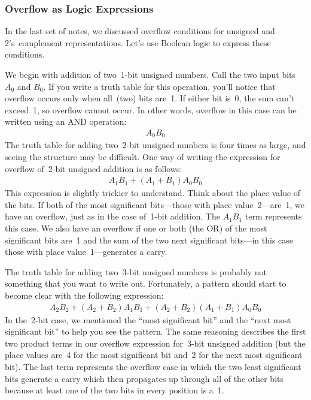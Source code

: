 \vfill

\subsubsection{Overflow as Logic Expressions}

In the last set of notes, we discussed overflow conditions for unsigned
and 2's~complement representations.  Let's use Boolean logic to express
these conditions.  

We begin with addition of two~\mbox{1-bit} unsigned numbers.  
Call the two input bits~$A_0$ and $B_0$.  If you write a truth table for
this operation, you'll notice that overflow occurs only when all~(two)
bits are~1.  If either bit is~0, the sum can't exceed~1, so overflow
cannot occur.  In other words, overflow in this case can be written using
an AND operation: 
%
\begin{eqnarray*}
A_0B_0
\end{eqnarray*}
%
The truth table for adding two~\mbox{2-bit} unsigned numbers is four
times as large, and seeing the structure may be difficult.  One way of
writing the expression for overflow of~\mbox{2-bit} unsigned addition is
as follows:
%
\begin{eqnarray*}
A_1B_1 + (A_1+B_1)A_0B_0
\end{eqnarray*}
%
This expression is slightly trickier to understand.  Think about the
place value of the bits.  If both of the most significant bits---those
with place value~2---are~1,
we have an overflow, just as in the case of~\mbox{1-bit} addition.
The $A_1B_1$ term represents this case.  We also have an overflow if
one or both (the OR) of the most significant bits are~1 and the
sum of the two next significant bits---in this case those with place 
value~1---generates a carry.

The truth table for adding two~\mbox{3-bit} unsigned numbers is 
probably not something that you want to write out.  Fortunately,
a pattern should start to become clear with the following expression:
%
\begin{eqnarray*}
A_2B_2 + (A_2+B_2)A_1B_1 + (A_2+B_2)(A_1+B_1)A_0B_0
\end{eqnarray*}
%
In the~\mbox{2-bit} case, we mentioned the ``most significant bit''
and the ``next most significant bit'' to help you see the pattern.
The same reasoning describes the first two product terms in our
overflow expression for~\mbox{3-bit} unsigned addition (but the place
values are~4 for the most significant bit and~2 for the next most
significant bit).  The last term represents the overflow case in which
the two least significant bits generate a carry which then propagates
up through all of the other bits because at least one of the two bits
in every position is a~1.

